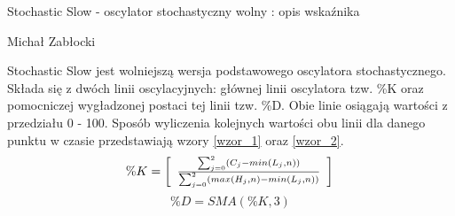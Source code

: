 \documentclass[12pt,a4paper]{article}
\begin{document}
\begin{center}
\begin{large}
Stochastic Slow - oscylator stochastyczny wolny : opis wskaźnika\\
\end{large}
Michał Zabłocki
\end{center}

Stochastic Slow jest wolniejszą wersja podstawowego oscylatora stochastycznego. Składa się z dwóch linii oscylacyjnych: głównej linii oscylatora tzw. \%K oraz pomocniczej wygładzonej postaci tej linii tzw. \%D. Obie linie osiągają wartości z przedziału 0 - 100.  Sposób wyliczenia kolejnych wartości obu linii dla danego punktu w czasie przedstawiają wzory \ref{wzor_1} oraz \ref{wzor_2}.
\begin{equation}
\%K = \left[\begin{array}{c} \frac{ \sum_{j=0}^{2} (C_j - min(L_j, n))}{ \sum_{j=0}^{2} (max(H_j, n) - min(L_j, n))}\end{array}\right]\\
\label{wzor_1}
\end{equation}
\begin{equation}
\%D = SMA(\%K, 3)
\label{wzor_2}
\end{equation}
\end{document}

